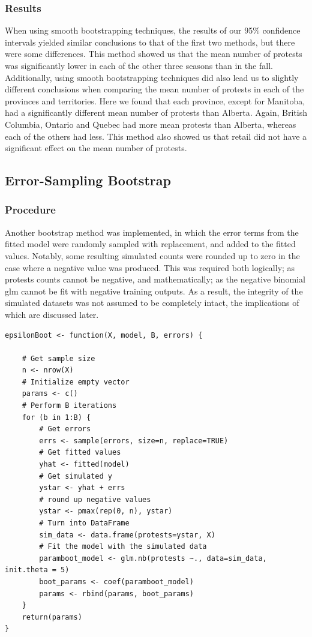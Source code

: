 \documentclass[12pt]{article}
\begin{document}
\subsubsection*{Results}
When using smooth bootstrapping techniques, the results of our 95\% confidence intervals yielded similar conclusions to that of the first two methods, but there were some differences. This method showed us that the mean number of protests was significantly lower in each of the other three seasons than in the fall.
Additionally, using smooth bootstrapping techniques did also lead us to slightly different conclusions when comparing the mean number of protests in each of the provinces and territories. Here we found that each province, except for Manitoba, had a significantly different mean number of protests than Alberta. Again, British Columbia, Ontario and Quebec had more mean protests than Alberta, whereas each of the others had less.
This method also showed us that retail did not have a significant effect on the mean number of protests.



\subsection{Error-Sampling Bootstrap}
\subsubsection*{Procedure}
Another bootstrap method was implemented, in which the error terms from the fitted model were randomly sampled with replacement, and added to the fitted values. Notably, some resulting simulated counts were rounded up to zero in the case where a negative value was produced. This was required both logically; as protests counts cannot be negative, and mathematically; as the negative binomial glm cannot be fit with negative training outputs. As a result, the integrity of the simulated datasets was not assumed to be completely intact, the implications of which are discussed later.

\vspace{0.5cm}
\begin{lstlisting}
epsilonBoot <- function(X, model, B, errors) {

    # Get sample size
    n <- nrow(X)
    # Initialize empty vector
    params <- c()
    # Perform B iterations
    for (b in 1:B) {
        # Get errors
        errs <- sample(errors, size=n, replace=TRUE)
        # Get fitted values
        yhat <- fitted(model)
        # Get simulated y
        ystar <- yhat + errs
        # round up negative values
        ystar <- pmax(rep(0, n), ystar)
        # Turn into DataFrame
        sim_data <- data.frame(protests=ystar, X)
        # Fit the model with the simulated data
        paramboot_model <- glm.nb(protests ~., data=sim_data, init.theta = 5)
        boot_params <- coef(paramboot_model)
        params <- rbind(params, boot_params)
    }
    return(params)
}
\end{lstlisting}
\end{document}
